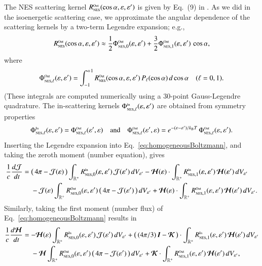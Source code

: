 \documentclass[11pt,letterpaper,twoside,english,final]{article}
\newcommand{\NES}{\mbox{\tiny NES}}
\begin{document}
The NES scattering kernel $R_{\NES}^{\Out}(\cos\alpha,\epsilonNu,\epsilonNu')$ is given by Eq.~(9) in \citet{mezzacappaBruenn_1993c}.  
As we did in the isoenergetic scattering case, we approximate the angular dependence of the scattering kernels by a two-term Legendre expansion; e.g.,
\begin{equation}
  R^{\Out}_{\NES}(\cos\alpha,\epsilonNu,\epsilonNu') 
  \approx \f{1}{2} \Phi_{\NES,0}^{\Out}(\epsilonNu,\epsilonNu') + \f{3}{2}\Phi^{\Out}_{\NES,1}(\epsilonNu,\epsilonNu')\,\cos\alpha,
\end{equation}
where
\begin{equation}
  \Phi_{\NES,\ell}^{\Out}(\epsilonNu,\epsilonNu')
  =\int_{-1}^{+1}R_{\NES}^{\Out}(\cos\alpha,\epsilonNu,\epsilonNu')\,P_{\ell}(\cos\alpha)\,d\cos\alpha \quad (\ell=0,1).  
\end{equation}
(These integrals are computed numerically using a 30-point Gauss-Legendre quadrature.  
The in-scattering kernels $\Phi_{\NES,\ell}^{\In}(\epsilonNu,\epsilonNu')$ are obtained from symmetry properties \citep{cernohorsky_1994}
\begin{equation}
  \Phi_{\NES,\ell}^{\In}(\epsilonNu,\epsilonNu')=\Phi_{\NES,\ell}^{\Out}(\epsilonNu',\epsilonNu)
  \quad\text{and}\quad
  \Phi_{\NES,\ell}^{\Out}(\epsilonNu',\epsilonNu)
  =e^{-(\epsilonNu-\epsilonNu')/k_{\mbox{\tiny B}}T}\,\Phi_{\NES,\ell}^{\Out}(\epsilonNu,\epsilonNu').
  \label{eq:symmetryNES}
\end{equation}
Inserting the Legendre expansion into Eq.~\eqref{eq:homogeneousBoltzmann}, and taking the zeroth moment (number equation), gives
\begin{align}
  \f{1}{c}\deriv{\cJ}{t}
  &=\big(\,4\pi-\cJ(\epsilonNu)\,\big)\int_{\bbR^{+}}R_{\NES,0}^{\In}(\epsilonNu,\epsilonNu')\,\cJ(\epsilonNu')\,dV_{\epsilonNu'}
  -\bcH(\epsilonNu)\cdot\int_{\bbR^{+}}R_{\NES,1}^{\In}(\epsilonNu,\epsilonNu')\,\bcH(\epsilonNu')\,dV_{\epsilonNu'} \nonumber \\
  & \hspace{12pt}
  -\cJ(\epsilonNu)\int_{\bbR^{+}}R_{\NES,0}^{\Out}(\epsilonNu,\epsilonNu')\,\big(\,4\pi-\cJ(\epsilonNu')\,\big)\,dV_{\epsilonNu'}
  +\bcH(\epsilonNu)\cdot\int_{\bbR^{+}}R_{\NES,1}^{\Out}(\epsilonNu,\epsilonNu')\,\bcH(\epsilonNu')\,dV_{\epsilonNu'}.  
\end{align}
Similarly, taking the first moment (number flux) of Eq.~\eqref{eq:homogeneousBoltzmann} results in
\begin{align}
  \f{1}{c}\deriv{\bcH}{t}
  &=-\bcH(\epsilonNu)\int_{\bbR^{+}}R_{\NES,0}^{\In}(\epsilonNu,\epsilonNu')\,\cJ(\epsilonNu')\,dV_{\epsilonNu'}
  +\big(\,(4\pi/3)\,\bI-\bcK\,\big)\cdot\int_{\bbR^{+}}R_{\NES,1}^{\In}(\epsilonNu,\epsilonNu')\,\bcH(\epsilonNu')\,dV_{\epsilonNu'} \nonumber \\
  & \hspace{12pt}
  -\bcH\int_{\bbR^{+}}R_{\NES,0}^{\Out}(\epsilonNu,\epsilonNu')\,\big(\,4\pi-\cJ(\epsilonNu')\,\big)\,dV_{\epsilonNu'}
  +\bcK\cdot\int_{\bbR^{+}}R_{\NES,1}^{\Out}(\epsilonNu,\epsilonNu')\,\bcH(\epsilonNu')\,dV_{\epsilonNu'},
\end{align}
\end{document}
